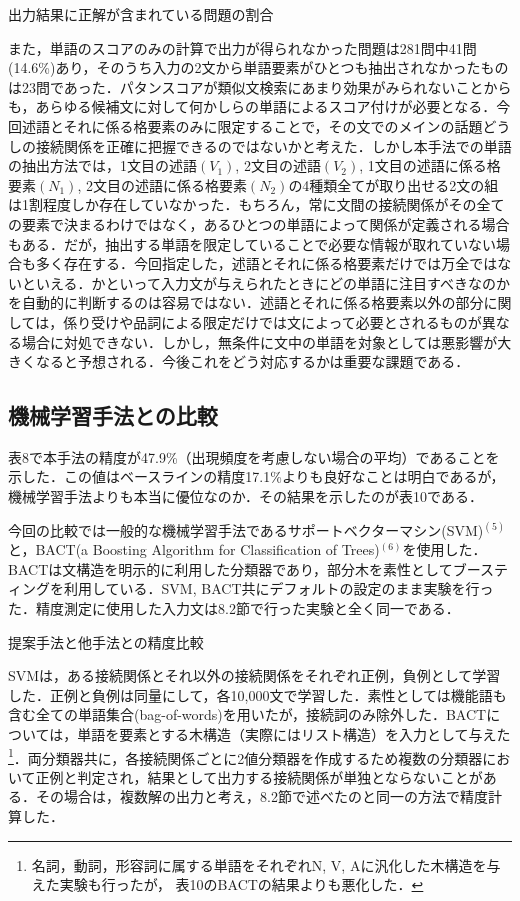\documentclass[japanese]{jnlp_1.4}
\begin{document}
\begin{table}[t]
\caption{出力結果に正解が含まれている問題の割合}

\end{table}

また，単語のスコアのみの計算で出力が得られなかった問題は281問中41問(14.6\%)あり，そのうち入力の2文から単語要素がひとつも抽出されなかったものは23問であった．パタンスコアが類似文検索にあまり効果がみられないことからも，あらゆる候補文に対して何かしらの単語によるスコア付けが必要となる．今回述語とそれに係る格要素のみに限定することで，その文でのメインの話題どうしの接続関係を正確に把握できるのではないかと考えた．しかし本手法での単語の抽出方法では，1文目の述語$(V_{1})$, 2文目の述語$(V_{2})$, 1文目の述語に係る格要素$(N_{1})$, 2文目の述語に係る格要素$(N_{2})$の4種類全てが取り出せる2文の組は1割程度しか存在していなかった．もちろん，常に文間の接続関係がその全ての要素で決まるわけではなく，あるひとつの単語によって関係が定義される場合もある．だが，抽出する単語を限定していることで必要な情報が取れていない場合も多く存在する．今回指定した，述語とそれに係る格要素だけでは万全ではないといえる．かといって入力文が与えられたときにどの単語に注目すべきなのかを自動的に判断するのは容易ではない．述語とそれに係る格要素以外の部分に関しては，係り受けや品詞による限定だけでは文によって必要とされるものが異なる場合に対処できない．しかし，無条件に文中の単語を対象としては悪影響が大きくなると予想される．今後これをどう対応するかは重要な課題である．

\subsection{機械学習手法との比較}

表8で本手法の精度が47.9{\%}（出現頻度を考慮しない場合の平均）であることを示した．この値はベースラインの精度17.1{\%}よりも良好なことは明白であるが，機械学習手法よりも本当に優位なのか．その結果を示したのが表10である．

今回の比較では一般的な機械学習手法であるサポートベクターマシン(SVM)$^{(5)}$と，BACT(a Boosting Algorithm for Classification of Trees)$^{(6)}$を使用した．BACTは文構造を明示的に利用した分類器であり，部分木を素性としてブースティングを利用している．SVM, BACT共にデフォルトの設定のまま実験を行った．精度測定に使用した入力文は8.2節で行った実験と全く同一である．

\begin{table}[t]
\caption{提案手法と他手法との精度比較}

\end{table}

SVMは，ある接続関係とそれ以外の接続関係をそれぞれ正例，負例として学習した．正例と負例は同量にして，各10,000文で学習した．素性としては機能語も含む全ての単語集合(bag-of-words)を用いたが，接続詞のみ除外した．BACTについては，単語を要素とする木構造（実際にはリスト構造）を入力として与えた\footnote{
	名詞，動詞，形容詞に属する単語をそれぞれN, V, Aに汎化した木構造を与えた実験も行ったが，
	表10のBACTの結果よりも悪化した．
}．両分類器共に，各接続関係ごとに2値分類器を作成するため複数の分類器において正例と判定され，結果として出力する接続関係が単独とならないことがある．その場合は，複数解の出力と考え，8.2節で述べたのと同一の方法で精度計算した．
\end{document}
